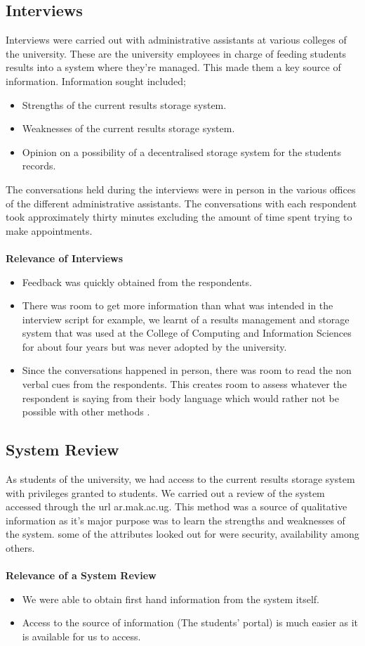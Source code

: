 \subsection{Interviews}
Interviews were carried out with administrative assistants at various colleges of the university. These are the university employees in charge of feeding students results into a system where they're managed. This made them a key source of information. Information sought included;
\begin{itemize}
\item Strengths of the current results storage system.
\item Weaknesses of the current results storage system.
\item Opinion on a possibility of a decentralised storage system for the students records.
\end{itemize}
The conversations held during the interviews were in person in the various offices of the different administrative assistants. The conversations with each respondent took approximately thirty minutes excluding the amount of time spent trying to make appointments.\\~\\
\textbf{Relevance of Interviews}
\begin{itemize}
\item Feedback was quickly obtained from the respondents.
\item There was room to get more information than what was intended in the interview script for example, we learnt of a results management and storage system that was used at the College of Computing and Information Sciences for about four years but was never adopted by the university.
\item Since the conversations happened in person, there was room to read the non verbal cues from the respondents. This creates room to assess whatever the respondent is saying from their body language which would rather not be possible with other methods \cite{art13}.
\end{itemize}

\subsection{System Review}
As students of the university, we had access to the current results storage system with privileges granted to students. We carried out a review of the system accessed through the url ar.mak.ac.ug. This method was a source of qualitative information as it's major purpose was to learn the strengths and weaknesses of the system. some of the attributes looked out for were security, availability among others.\\~\\
\textbf{Relevance of a System Review}
\begin{itemize}
\item We were able to obtain first hand information from the system itself.
\item Access to the source of information (The students' portal) is much easier as it is available for us to access.
\end{itemize}


